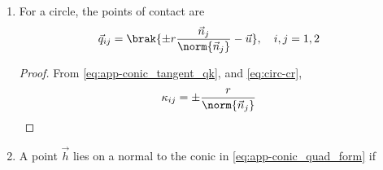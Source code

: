 \begin{enumerate}[label=\thesubsection.\arabic*.,ref=\thesubsection.\theenumi]
  \begin{proof}
The normal vectors of the lines in \eqref{eq:quad_form_pair} are 
  \begin{align} 
  \label{eq:quad_form_pair_normvecs}
  \begin{split}
  \vec{n}_1 &= \vec{P}\myvec{\sqrt{\abs{\lambda_1}} \\[2mm]  \sqrt{\abs{\lambda_2}}}
  \\
  \vec{n}_2 &= \vec{P}\myvec{\sqrt{\abs{\lambda_1}} \\[2mm] - \sqrt{\abs{\lambda_2}}}
  \end{split}
  \end{align} 
  The angle between the asymptotes is given by 
\begin{align} 
\label{eq:app-quad_form_pair_ang_exp}
\cos\theta=\frac{\vec{n_1}^{\top}\vec{n_2}}{\norm{\vec{n_1}}\norm{\vec{n_2}}}
\end{align} 
The orthogonal matrix $\vec{P}$ preserves the norm, i.e.
\begin{align} 
	\norm{\vec{n_1}} &= \norm{\vec{P}\myvec{\sqrt{\abs{\lambda_1}} \\[2mm]  \sqrt{\abs{\lambda_2}}}}
	=\norm{\myvec{\sqrt{\abs{\lambda_1}} \\[2mm]  \sqrt{\abs{\lambda_2}}}}
	\\
	&=\sqrt{\abs{\lambda_1}+\abs{\lambda_2}} = \norm{\vec{n_2}}
\end{align} 
It is easy to verify that 
\begin{align} 
\vec{n_1}^{\top}\vec{n_2} = \abs{\lambda_1}-\abs{\lambda_2}
\end{align} 
%
Thus, the angle between the asymptotes is obtained from \eqref{eq:app-quad_form_pair_ang_exp} as \eqref{eq:app-quad_form_pair_ang}.
  \end{proof}
\item For a circle, the points of contact are
	\begin{align}
	\vec{q}_{ij} &= \brak{\pm r \frac{\vec{n}_j}{\norm{\vec{n}_j}}-\vec{u}}, \quad i,j = 1,2
\end{align}
\begin{proof}
	From 
\eqref{eq:app-conic_tangent_qk},
and 
	\eqref{eq:circ-cr},
\begin{align}
\kappa_{ij} &= \pm 
\frac{r
}
{
	\norm{\vec{n}_j}
}
\end{align}
\end{proof}
\item A point $\vec{h}$ lies on a normal to the conic in \eqref{eq:app-conic_quad_form} 
	if

\end{enumerate}
